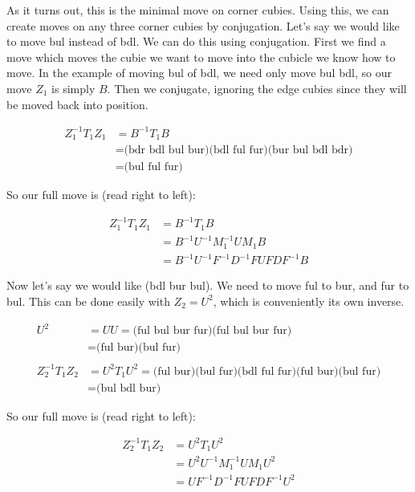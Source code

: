 As it turns out, this is the minimal move on corner cubies.  Using
this, we can create moves on any three corner cubies by conjugation.
Let's say we would like to move bul instead of bdl.  We can do this
using conjugation.  First we find a move which moves the cubie we want
to move into the cubicle we know how to move.  In the example of
moving bul of bdl, we need only move bul bdl, so our move $Z_1$ is
simply $B$.  Then we conjugate, ignoring the edge cubies since they
will be moved back into position.

\begin{align*}
  Z_1^{-1}T_1Z_1
  &= B^{-1}T_1B \\
  &= \text{(bdr bdl bul bur)(bdl ful fur)(bur bul bdl bdr)} \\
  &= \text{(bul ful fur)}
\end{align*}

So our full move is (read right to left):

\begin{align*}
  Z_1^{-1} T_1 Z_1
  &= B^{-1} T_1 B \\
  &= B^{-1} U^{-1} M_1^{-1} U M_1 B \\
  &= B^{-1} U^{-1} F^{-1}D^{-1}F U FDF^{-1} B
\end{align*}

Now let's say we would like (bdl bur bul).  We need to move ful to
bur, and fur to bul.  This can be done easily with $Z_2 = U^2$, which
is conveniently its own inverse.

\begin{align*}
  U^2
  &= UU = \text{(ful bul bur fur)(ful bul bur fur)} \\
  &= \text{(ful bur)(bul fur)} \\
  & \\
  Z_2^{-1}T_1Z_2
  &= U^2T_1U^2 = \text{(ful bur)(bul fur)(bdl ful fur)(ful bur)(bul fur)} \\
  &= \text{(bul bdl bur)}
\end{align*}

So our full move is (read right to left):

\begin{align*}
  Z_2^{-1} T_1 Z_2
  &= U^2 T_1 U^2 \\
  &= U^2 U^{-1} M_1^{-1} U M_1 U^2 \\
  &= U F^{-1}D^{-1}F U FDF^{-1} U^2
\end{align*}
  
